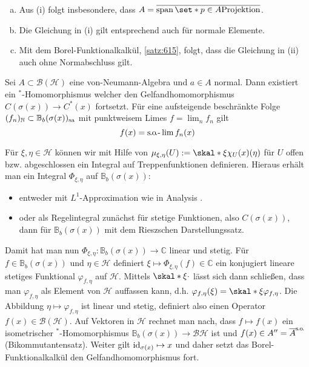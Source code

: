 \begin{bemerkung}
	\leavevmode
	\begin{enumerate}[a)]
		\item Aus (i) folgt insbesondere, dass $A= \overline{\Span \set*{p \in A \text{Projektion} }}$.
		\item Die Gleichung in (i) gilt entsprechend auch für normale Elemente.
		\item Mit dem Borel-Funktionalkalkül, \autoref{satz:615}, folgt, dass die Gleichung in (ii) auch ohne Normabschluss gilt.
	\end{enumerate}
\end{bemerkung}

\begin{satz}[label=satz:615,name={Borel Funktionalkalkül}]
	Sei $A \subset \mathcal{B}(\mathcal{H})$ eine von-Neumann-Algebra und $a \in A$ normal.
	Dann existiert ein $^*$-Homomorphismus
	welcher den Gelfandhomomorphismus $C(\sigma(x)) \to C^*(x)$ fortsetzt.
	Für eine aufsteigende beschränkte Folge $(f_n)_\mathbb{N} \subset \mathbb{B}_b(\sigma(x))_{\mathrm{sa}}$ mit punktweisem Limes $f=\lim_n f_n$ gilt
	\[
		f(x) =\mathrm{s\mkern-1.4mu.\mkern-.6mu o\mkern-1.7mu.}\text{-}\lim f_n(x)
	\]
\end{satz}
\begin{beweis}[name={Skizze}]
	Für $\xi,\eta \in \mathcal{H}$ können wir mit Hilfe von
	\(
		\mu_{\xi,\eta}(U) := \skal*{\xi}{\chi_U(x)(\eta)}
	\)
	für $U$ offen bzw. abgeschlossen ein Integral auf Treppenfunktionen definieren.
	Hieraus erhält man ein Integral $\Phi_{\xi,\eta}$ auf $\mathbb{B}_b(\sigma(x))$:
	\begin{itemize}
		\item entweder mit $L^1$-Approximation wie in Analysis .
		\item oder als Regelintegral zunächst für stetige Funktionen, also $C(\sigma(x))$, dann für $\mathbb{B}_b(\sigma(x))$ mit dem Rieszschen Darstellungssatz.
	\end{itemize}
	Damit hat man nun $\Phi_{\xi,\eta} \colon \mathbb{B}_b(\sigma(x)) \to \mathbb{C}$ linear und stetig.
	Für $f \in \mathbb{B}_b(\sigma(x))$ und $\eta \in \mathcal{H}$ definiert $\xi \mapsto \Phi_{\xi,\eta}(f) \in \mathbb{C}$ ein konjugiert lineare stetiges Funktional $\varphi_{f,\eta}$ auf $\mathcal{H}$.
	Mittels $\skal*{\xi}{\cdot }$ lässt sich dann schließen, dass man $\varphi_{f,\eta}$ als Element von $\mathcal{H}$ auffassen kann, d.h. $\varphi_{f,\eta}(\xi) = \skal*{\xi}{\varphi_{f,\eta}}$.
	Die Abbildung $\eta \mapsto \varphi_{f,\eta}$ ist linear und stetig, definiert also einen Operator $f(x) \in \mathcal{B}(\mathcal{H})$.
	Auf Vektoren in $\mathcal{H}$ rechnet man nach, dass $f \mapsto f(x)$ ein isometrischer $^*$-Homomorphismus $\mathbb{B}_b(\sigma(x)) \to \mathcal{B}{\mathcal{H}}$ ist und $f(x) \in A''= \overline{A}^{\mathrm{s\mkern-1.4mu.\mkern-.6mu o\mkern-1.7mu.}}$ (Bikommutantensatz).
	Weiter gilt $\operatorname{id}_{\sigma(x)} \mapsto x$ und daher setzt das Borel-Funktionalkalkül den Gelfandhomomorphismus fort.
\end{beweis}

